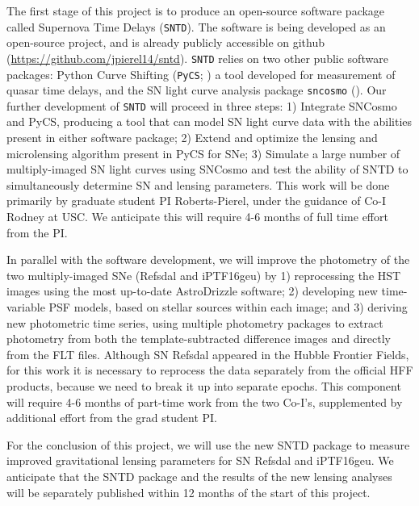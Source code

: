 \forceindent The first stage of this project is to produce an open-source software
package called Supernova Time Delays ({\tt SNTD}). The software is being
developed as an open-source project, and is already publicly
accessible on github (\url{https://github.com/jpierel14/sntd}).  {\tt SNTD}
relies on two other public software packages: Python Curve Shifting
({\tt PyCS}; \citealt{Tewes:2013a}) a tool developed for measurement of
quasar time delays, and the SN light curve analysis package {\tt sncosmo}
(\citep{Barbary:2014}). Our further development of {\tt SNTD} will proceed in three steps: 1)
Integrate SNCosmo and PyCS, producing a tool that can model
SN light curve data with the abilities present in either software
package; 2) Extend and optimize the lensing and microlensing algorithm
present in PyCS for SNe; 3) Simulate a large number of multiply-imaged
SN light curves using SNCosmo and test the ability of SNTD to
simultaneously determine SN and lensing parameters. This work will be
done primarily by graduate student PI Roberts-Pierel, under the
guidance of Co-I Rodney at USC.  We anticipate this will require 4-6
months of full time effort from the PI.

In parallel with the software development, we will improve the
photometry of the two multiply-imaged SNe (Refsdal and iPTF16geu) by
1) reprocessing the HST images using the most up-to-date AstroDrizzle
software; 2) developing new time-variable PSF models, based on stellar
sources within each image; and 3) deriving new photometric time
series, using multiple photometry packages to extract photometry from
both the template-subtracted difference images and directly from the
FLT files. Although SN Refsdal appeared in the Hubble Frontier Fields,
for this work it is necessary to reprocess the data separately from
the official HFF products, because we need to break it up into
separate epochs.  This component will require 4-6 months of part-time
work from the two Co-I's, supplemented by additional effort from the
grad student PI.

For the conclusion of this project, we will use the new SNTD package
to measure improved gravitational lensing parameters for SN Refsdal
and iPTF16geu.   We anticipate that the
SNTD package and the results of the new lensing analyses will be
separately published within 12 months of the start of this project.
